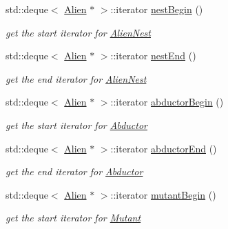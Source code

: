\begin{DoxyCompactItemize}
std\+::deque$<$ \hyperlink{class_alien}{Alien} $\ast$ $>$\+::iterator \hyperlink{class_alien_manager_a4af75ee3ee02f8e327d065d1079e37b6}{nest\+Begin} ()
\begin{DoxyCompactList}\small\item\em get the start iterator for \hyperlink{class_alien_nest}{Alien\+Nest} \end{DoxyCompactList}\item 
\mbox{\label{class_alien_manager_a98744d687508fa936af8fb07189fd599}} 
std\+::deque$<$ \hyperlink{class_alien}{Alien} $\ast$ $>$\+::iterator \hyperlink{class_alien_manager_a98744d687508fa936af8fb07189fd599}{nest\+End} ()
\begin{DoxyCompactList}\small\item\em get the end iterator for \hyperlink{class_alien_nest}{Alien\+Nest} \end{DoxyCompactList}\item 
\mbox{\label{class_alien_manager_ae64cfd417be6903c5999281e1ac5a027}} 
std\+::deque$<$ \hyperlink{class_alien}{Alien} $\ast$ $>$\+::iterator \hyperlink{class_alien_manager_ae64cfd417be6903c5999281e1ac5a027}{abductor\+Begin} ()
\begin{DoxyCompactList}\small\item\em get the start iterator for \hyperlink{class_abductor}{Abductor} \end{DoxyCompactList}\item 
\mbox{\label{class_alien_manager_a84234e49e21ab00caa9f3f8a492b0b8d}} 
std\+::deque$<$ \hyperlink{class_alien}{Alien} $\ast$ $>$\+::iterator \hyperlink{class_alien_manager_a84234e49e21ab00caa9f3f8a492b0b8d}{abductor\+End} ()
\begin{DoxyCompactList}\small\item\em get the end iterator for \hyperlink{class_abductor}{Abductor} \end{DoxyCompactList}\item 
\mbox{\label{class_alien_manager_a9aa20d1193e10765f9a7d52e0729bc29}} 
std\+::deque$<$ \hyperlink{class_alien}{Alien} $\ast$ $>$\+::iterator \hyperlink{class_alien_manager_a9aa20d1193e10765f9a7d52e0729bc29}{mutant\+Begin} ()
\begin{DoxyCompactList}\small\item\em get the start iterator for \hyperlink{class_mutant}{Mutant} \end{DoxyCompactList}\item 

\end{DoxyCompactItemize}
